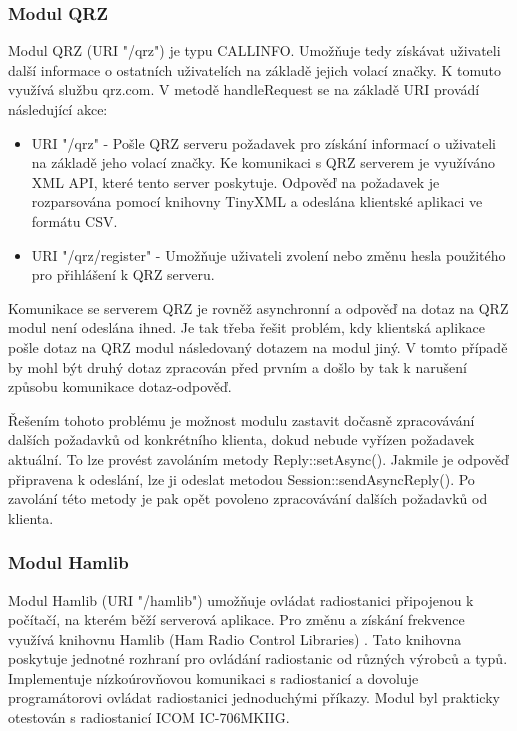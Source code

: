 \subsubsection{Modul QRZ}

Modul QRZ (URI "/qrz") je typu CALLINFO. Umožňuje tedy získávat uživateli další informace o ostatních uživatelích na základě jejich
volací značky. K tomuto využívá službu qrz.com. V metodě handleRequest se na základě URI provádí následující akce:

\begin{itemize}
\item URI "/qrz" - Pošle QRZ serveru požadavek pro získání informací o uživateli na základě jeho volací značky. Ke komunikaci 
s QRZ serverem je využíváno XML API, které tento server poskytuje. Odpověď na požadavek je rozparsována pomocí knihovny 
TinyXML a odeslána klientské aplikaci ve formátu CSV.
\item URI "/qrz/register" - Umožňuje uživateli zvolení nebo změnu hesla použitého pro přihlášení k QRZ serveru.
\end{itemize}

Komunikace se serverem QRZ je rovněž asynchronní a odpověď na dotaz na QRZ modul není odeslána ihned.
Je tak třeba řešit problém, kdy klientská aplikace pošle dotaz na QRZ modul
následovaný dotazem na modul jiný. V tomto případě by mohl být druhý dotaz zpracován před prvním a došlo by tak k narušení
způsobu komunikace dotaz-odpověď.

Řešením tohoto problému je možnost modulu zastavit dočasně zpracovávání dalších požadavků od konkrétního klienta, dokud 
nebude vyřízen požadavek aktuální. To lze provést zavoláním metody Reply::setAsync(). Jakmile je odpověď připravena
k odeslání, lze ji odeslat metodou Session::sendAsyncReply(). Po zavolání této metody je pak opět povoleno zpracovávání
dalších požadavků od klienta.

\subsubsection{Modul Hamlib}

Modul Hamlib (URI "/hamlib") umožňuje ovládat radiostanici připojenou k
počítačí, na kterém běží serverová aplikace.
Pro změnu a získání frekvence využívá knihovnu Hamlib (Ham Radio Control Libraries) \cite{hamlib}.
Tato knihovna poskytuje jednotné rozhraní pro ovládání radiostanic od různých výrobců a typů.
Implementuje nízkoúrovňovou komunikaci s radiostanicí a dovoluje programátorovi ovládat 
radiostanici jednoduchými příkazy.
Modul byl prakticky otestován s radiostanicí ICOM IC-706MKIIG.

